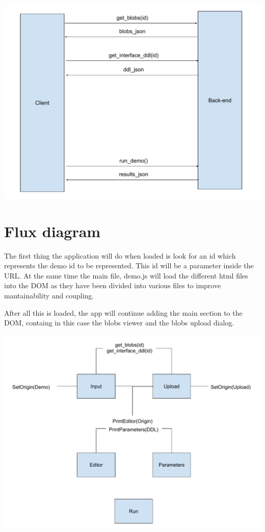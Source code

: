 \includegraphics[width=\textwidth]{images/client_server_interaction}


\section{Flux diagram}
The first thing the application will do when loaded is look for an id which represents
the demo id to be represented. This id will be a parameter inside the URL.
At the same time the main file, demo.js will load the different html files into the DOM
as they have been divided into various files to improve mantainability and coupling.

After all this is loaded, the app will continue adding the main section to the DOM,
 containg in this case the blobs viewer and the blobs upload dialog.
 
\includegraphics[width=\textwidth]{images/flux}

